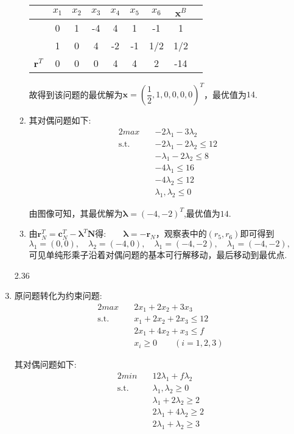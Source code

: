 \documentclass[UTF8]{ctexart}
\begin{document}
\begin{enumerate}
\begin{enumerate}
\begin{table}[H]
\centering
	\begin{tabular}{ccccccccc}
	\toprule
	{}&$x_1$&$x_2$&$x_3$&$x_4$&$x_5$&$x_6$&$\bm{x}^{B}$\\
	\midrule
     {}    & 0     & 1     & -4    & 4     & 1     & -1    & 1 \\
     {}    & 1     & 0     & 4     & -2    & -1    & 1/2   & 1/2 \\
       $\bm{r}^T$     & 0     & 0     & 0     & 4     & 4     & 2     & -14 \\
	\bottomrule
	\end{tabular}
\end{table}

故得到该问题的最优解为$\bm{x}=(\dfrac{1}{2},1,0,0,0,0)^T$，最优值为$14$.

\item 其对偶问题如下:
\begin{alignat}{2}
max \quad & -2\lambda_1-3\lambda_2 \nonumber\\
\mbox{s.t.}\quad
&-2\lambda_1-2\lambda_2 \leq 12\nonumber\\
&-\lambda_1-2\lambda_2\leq 8\nonumber\\
&-4\lambda_1 \leq 16\nonumber\\
&-4\lambda_2 \leq 12\nonumber\\
&\lambda_1,\lambda_2 \leq 0
\end{alignat}

由图像可知，其最优解为$\bm{\lambda}=(-4,-2)^T$,最优值为$14$.


\item 由$\bm{r}^T_N=\bm{c}^T_N-\bm{\lambda}^T\bm{N}$得:$\qquad\bm{\lambda}=-\bm{r}_N$，观察表中的$(r_5,r_6)$即可得到$\lambda_1=(0,0),\quad \lambda_2=(-4,0),\quad \lambda_1=(-4,-2),\quad \lambda_1=(-4,-2),\quad $
可见单纯形乘子沿着对偶问题的基本可行解移动，最后移动到最优点.

\end{enumerate}
\item[2.36]
\item 原问题转化为约束问题:
\begin{alignat}{2}
max \quad & 2x_1+2x_2+3x_3 \nonumber\\
\mbox{s.t.}\quad
&x_1+2x_2+2x_3\leq 12\nonumber\\
&2x_1+4x_2+x_3\leq f\nonumber\\
&x_i \geq 0 \qquad(i=1,2,3)
\end{alignat}

其对偶问题如下:
\begin{alignat}{2}
min \quad &12\lambda_1+f\lambda_2 \nonumber\\
\mbox{s.t.}\quad
&\lambda_1,\lambda_2 \geq 0\nonumber\\
&\lambda_1+2\lambda_2 \geq 2\nonumber\\
&2\lambda_1+4\lambda_2 \geq 2\nonumber\\
&2\lambda_1+\lambda_2\geq 3
\end{alignat}


\end{enumerate}
\end{document}
